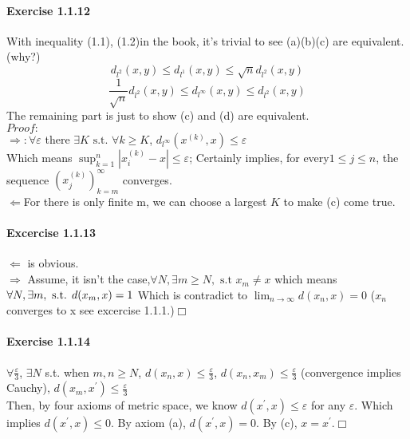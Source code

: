\paragraph{Exercise 1.1.12}
With inequality (1.1), (1.2)in the book, it's trivial to see (a)(b)(c) are equivalent.(why?) \[d_{l^2}(x,y)\leq d_{l^1}(x,y)\leq\sqrt{n}d_{l^2}(x,y) \]%
\[\frac{1}{\sqrt{n}}d_{l^2}(x,y)\leq d_{l^\infty}(x,y)\leq d_{l^2}(x,y) \]
The remaining part is just to show (c) and (d) are equivalent.\\
$Proof: $\\$\Rightarrow :$$\forall \varepsilon $ there $\exists K \text{ s.t.}$ $\forall k \geqslant K$, $ d_{l^\infty}(x^{(k)},x)\leq \varepsilon$ \\
Which means $\sup_{k=1}^{n}|x_{i}^{(k)}-x|\leq \varepsilon$;
Certainly implies, for every$1 \leq j \leq n$, the sequence $ {(x_{j}^{(k)})}_{k=m}^{\infty}$ converges.\\$\Leftarrow$For there is only finite m, we can choose a largest $K$ to make (c) come true.
\paragraph{Excercise 1.1.13}$\Leftarrow$ is obvious.\\
$\Rightarrow$ Assume, it isn't the case,$\forall N, \exists m \geq N,\text{ s.t } x_{m}\neq x$ which means $ \forall N, \exists m, \text{ s.t. }\\d(x_{m},x)=1$ Which is contradict to $\lim_{n\rightarrow\infty}d(x_{n},x)=0$ ($x_{n}$ converges to x see excercise 1.1.1.)$\Box$
\paragraph{Exercise 1.1.14}
$\forall \frac{\varepsilon}{3}$, $\exists N$ s.t. when $m, n\geq N$, $d(x_{n},x)\leq\frac{\varepsilon}{3}$, $d(x_{n},x_{m})\leq\frac{\varepsilon}{3}$ (convergence implies Cauchy), $d(x_{m},x^{\prime})\leq\frac{\varepsilon}{3}$\\Then, by four axioms of metric space, we know $d(x^{\prime},x)\leq \varepsilon$ for any $\varepsilon$. Which implies $d(x^{\prime},x)\leq 0$. By axiom (a), $d(x^{\prime},x)=0$. By (c), $x=x^{\prime}$.$\Box$

